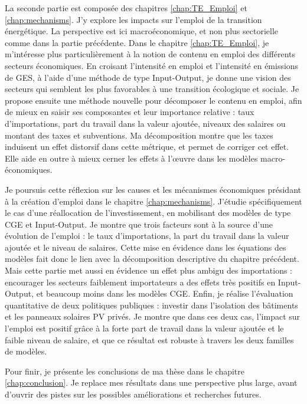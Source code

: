 La seconde partie est composée des chapitres \ref{chap:TE_Emploi} et \ref{chap:mechanisms}. J'y explore les impacts sur l'emploi de la transition énergétique. La perspective est ici macroéconomique, et non plus sectorielle comme dans la partie précédente.
Dans le chapitre \ref{chap:TE_Emploi}, je m'intéresse plus particulièrement à la notion de contenu en emploi des différents secteurs économiques. En croisant l'intensité en emploi et l'intensité en émissions de GES, à l'aide d'une méthode de type Input-Output, je donne une vision des secteurs qui semblent les plus favorables à une transition écologique et sociale. Je propose ensuite une méthode nouvelle pour décomposer le contenu en emploi, afin de mieux en saisir ses composantes et leur importance relative : taux d'importations, part du travail dans la valeur ajoutée, niveaux des salaires ou montant des taxes et subventions. Ma décomposition montre que les taxes induisent un effet distorsif dans cette métrique, et permet de corriger cet effet. Elle aide en outre à mieux cerner les effets à l'\oe{}uvre dans les modèles macro-économiques.

Je poursuis cette réflexion sur les causes et les mécanismes économiques présidant à la création d'emploi dans le chapitre \ref{chap:mechanisms}. J'étudie spécifiquement le cas d'une réallocation de l'investissement, en mobilisant des modèles de type CGE et Input-Output. Je montre que trois facteurs sont à la source d'une évolution de l'emploi : le taux d'importations, la part du travail dans la valeur ajoutée et le niveau de salaires. Cette mise en évidence dans les équations des modèles fait donc le lien avec la décomposition descriptive du chapitre précédent. Mais cette partie met aussi en évidence un effet plus ambigu des importations : encourager les secteurs faiblement importateurs a des effets très positifs en Input-Output, et beaucoup moins dans les modèles CGE. Enfin, je réalise l'évaluation quantitative de deux politiques publiques : investir dans l'isolation des bâtiments et les panneaux solaires PV privés. Je montre que dans ces deux cas, l'impact sur l'emploi est positif grâce à la forte part de travail dans la valeur ajoutée et le faible niveau de salaire, et que ce résultat est robuste à travers les deux familles de modèles. 

Pour finir, je présente les conclusions de ma thèse dans le chapitre \ref{chap:conclusion}. Je replace mes résultats dans une perspective plus large, avant d'ouvrir des pistes sur les possibles améliorations et recherches futures.





